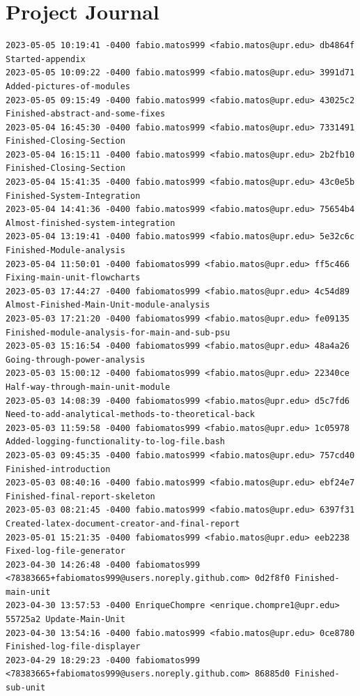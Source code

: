 \documentclass[12pt]{article}
\begin{document}
\section{Project Journal}
\begin{lstlisting}
2023-05-05 10:19:41 -0400 fabio.matos999 <fabio.matos@upr.edu> db4864f Started-appendix
2023-05-05 10:09:22 -0400 fabio.matos999 <fabio.matos@upr.edu> 3991d71 Added-pictures-of-modules
2023-05-05 09:15:49 -0400 fabio.matos999 <fabio.matos@upr.edu> 43025c2 Finished-abstract-and-some-fixes
2023-05-04 16:45:30 -0400 fabio.matos999 <fabio.matos@upr.edu> 7331491 Finished-Closing-Section
2023-05-04 16:15:11 -0400 fabio.matos999 <fabio.matos@upr.edu> 2b2fb10 Finished-Closing-Section
2023-05-04 15:41:35 -0400 fabio.matos999 <fabio.matos@upr.edu> 43c0e5b Finished-System-Integration
2023-05-04 14:41:36 -0400 fabio.matos999 <fabio.matos@upr.edu> 75654b4 Almost-finished-system-integration
2023-05-04 13:19:41 -0400 fabio.matos999 <fabio.matos@upr.edu> 5e32c6c Finished-Module-analysis
2023-05-04 11:50:01 -0400 fabiomatos999 <fabio.matos@upr.edu> ff5c466 Fixing-main-unit-flowcharts
2023-05-03 17:44:27 -0400 fabiomatos999 <fabio.matos@upr.edu> 4c54d89 Almost-Finished-Main-Unit-module-analysis
2023-05-03 17:21:20 -0400 fabiomatos999 <fabio.matos@upr.edu> fe09135 Finished-module-analysis-for-main-and-sub-psu
2023-05-03 15:16:54 -0400 fabiomatos999 <fabio.matos@upr.edu> 48a4a26 Going-through-power-analysis
2023-05-03 15:00:12 -0400 fabiomatos999 <fabio.matos@upr.edu> 22340ce Half-way-through-main-unit-module
2023-05-03 14:08:39 -0400 fabiomatos999 <fabio.matos@upr.edu> d5c7fd6 Need-to-add-analytical-methods-to-theoretical-back
2023-05-03 11:59:58 -0400 fabiomatos999 <fabio.matos@upr.edu> 1c05978 Added-logging-functionality-to-log-file.bash
2023-05-03 09:45:35 -0400 fabio.matos999 <fabio.matos@upr.edu> 757cd40 Finished-introduction
2023-05-03 08:40:16 -0400 fabio.matos999 <fabio.matos@upr.edu> ebf24e7 Finished-final-report-skeleton
2023-05-03 08:21:45 -0400 fabio.matos999 <fabio.matos@upr.edu> 6397f31 Created-latex-document-creator-and-final-report
2023-05-01 15:21:35 -0400 fabiomatos999 <fabio.matos@upr.edu> eeb2238 Fixed-log-file-generator
2023-04-30 14:26:48 -0400 fabiomatos999 <78383665+fabiomatos999@users.noreply.github.com> 0d2f8f0 Finished-main-unit
2023-04-30 13:57:53 -0400 EnriqueChompre <enrique.chompre1@upr.edu> 55725a2 Update-Main-Unit
2023-04-30 13:54:16 -0400 fabio.matos999 <fabio.matos@upr.edu> 0ce8780 Finished-log-file-displayer
2023-04-29 18:29:23 -0400 fabiomatos999 <78383665+fabiomatos999@users.noreply.github.com> 86885d0 Finished-sub-unit

\end{lstlisting}
\end{document}
